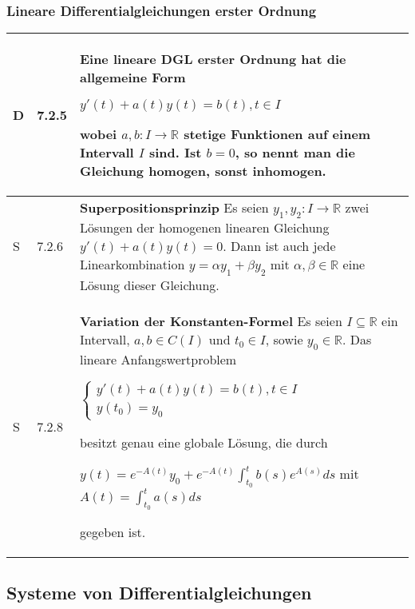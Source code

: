 \subsubsection{Lineare Differentialgleichungen erster Ordnung}

    \begin{longtable}{p{0.75cm} p{1cm} p{16cm}}
        \toprule

        D   & 7.2.5 &   Eine lineare DGL erster Ordnung hat die allgemeine Form \hfill \break
                        \centerline{$ y'(t) + a(t) y(t) = b(t), t \in I$}
                        wobei $a,b: I \rightarrow \mathbb{R}$ stetige Funktionen auf einem Intervall $I$ sind. \hfill \break
                        Ist $b= 0$, so nennt man die Gleichung homogen, sonst inhomogen. \\
        \midrule
        S   & 7.2.6 &   \textbf{Superpositionsprinzip} \hfill \break
                        Es seien $y_1, y_2: I \rightarrow \mathbb{R}$ zwei Lösungen der homogenen linearen Gleichung $y'(t) + a(t)y(t) = 0$.
                        Dann ist auch jede Linearkombination $y = \alpha y_1 + \beta y_2$ mit $\alpha, \beta \in \mathbb{R}$ eine Lösung dieser
                        Gleichung. \\
        \midrule
        S   & 7.2.8 &   \textbf{Variation der Konstanten-Formel} \hfill \break
                        Es seien $I \subseteq \mathbb{R}$ ein Intervall, $a,b \in C(I)$ und $t_0 \in I$, sowie $y_0 \in \mathbb{R}$. Das lineare
                        Anfangswertproblem \hfill \break
                        \centerline{$   \begin{cases}
                                        y'(t) + a(t)y(t) = b(t), t \in I \\
                                        y(t_0) = y_0
                                        \end{cases} $}
                        besitzt genau eine globale Lösung, die durch \hfill \break
                        \centerline{$ y(t) = e^{-A(t)} y_0 + e^{-A(t)} \int^t_{t_0} b(s)e^{A(s)}ds$ mit $ A(t) = \int^t_{t_0} a(s) ds $}
                        gegeben ist. \\
        \bottomrule

    \end{longtable}

\pagebreak

\subsection{Systeme von Differentialgleichungen}

